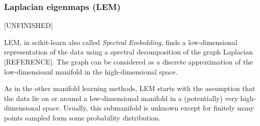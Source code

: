 \documentclass[journal, a4paper]{IEEEtran}
\begin{document}




\hfill
\subsubsection{Laplacian eigenmaps (LEM)}
[UNFINISHED]

LEM, in scikit-learn also called \textit{Spectral Embedding}, finds a low-dimensional representation of the data using a spectral decomposition of the graph Laplacian [REFERENCE].
The graph can be considered as a discrete approximation of the low-dimensioanl manifold in the high-dimensional space.

As in the other manifold learning methods, LEM starts with the assumption that the data lie on or around a low-dimensional manifold in a (potentially) very high-dimensional space. 
Usually, this submanifold is unknown except for finitely many points sampled form some probability distribution. 


%



%


\end{document}
